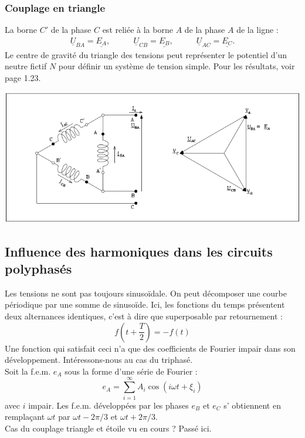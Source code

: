 		\subsubsection{Couplage en triangle}
		La borne $C'$ de la phase $C$ est reliée à la borne $A$ de la phase 
		$A$ de la ligne :
		\begin{equation}
		\begin{array}{ccc}
		\underline{U}_{BA} = \underline{E_A},\quad &\quad \underline{U}_{CB} = 
		\underline{E_B}, \quad&\quad \underline{U}_{AC} = \underline{E_C}.
		\end{array}		
		\end{equation}
		Le centre de gravité du triangle des tensions peut représenter le 
		potentiel d'un neutre fictif $N$ pour définir un système de tension 
		simple. Pour les résultats, voir page 1.23.
		\begin{center}
		\includegraphics[scale=0.4]{ch1/image10.png}
		\end{center}		
		
		
	\subsection{Influence des harmoniques dans les circuits polyphasés}
	Les tensions ne sont pas toujours sinusoïdale. On peut décomposer une courbe 
	périodique par une somme de sinusoïde. Ici, les fonctions du temps 
	présentent deux alternances identiques, c'est à dire que superposable par 
	retournement :
	\begin{equation}
	f(t+\frac{T}{2}) = -f(t)
	\end{equation}
	Une fonction qui satisfait ceci n'a que des coefficients de Fourier impair 
	dans son développement. Intéressons-nous au cas du triphasé. \\
	Soit la f.e.m. $e_A$ sous la forme d'une série de Fourier :
	\begin{equation}
	e_A = \sum_{i=1}^\infty A_i\cos(i\omega t + \xi_i)
	\end{equation}
	avec $i$ impair. Les f.e.m. développées par les phases $e_B$ et $e_C$ s'
	obtiennent en remplaçant $\omega t$ par $\omega t - 2\pi/3$ et $\omega t 
	+2\pi/3$.\\
	Cas du couplage triangle et étoile vu en cours ? Passé ici.
	
